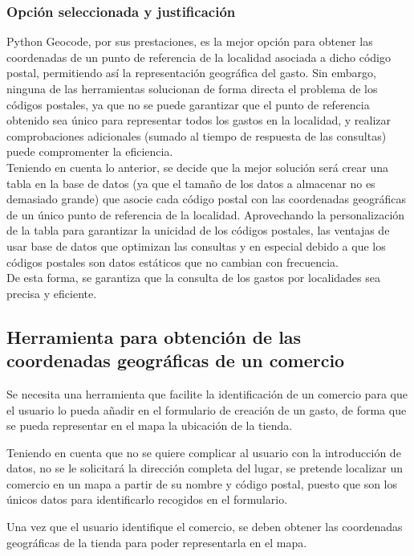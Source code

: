 \subsubsection{Opción seleccionada y justificación}\label{sec:justificacion_pgeocode}
Python Geocode, por sus prestaciones, es la mejor opción para obtener las coordenadas de un punto de referencia de la localidad asociada a dicho código postal, permitiendo así la representación geográfica del gasto. Sin embargo, ninguna de las herramientas solucionan de forma directa el problema de los códigos postales, ya que no se puede garantizar que el punto de referencia obtenido sea único para representar todos los gastos en la localidad, y realizar comprobaciones adicionales (sumado al tiempo de respuesta de las consultas) puede compromenter la eficiencia.\\
Teniendo en cuenta lo anterior, se decide que la mejor solución será crear una tabla en la base de datos (ya que el tamaño de los datos a almacenar no es demasiado grande) que asocie cada código postal con las coordenadas geográficas de un único punto de referencia de la localidad. Aprovechando la personalización de la tabla para garantizar la unicidad de los códigos postales, las ventajas de usar base de datos que optimizan las consultas y en especial debido a que los códigos postales son datos estáticos que no cambian con frecuencia.\\
De esta forma, se garantiza que la consulta de los gastos por localidades sea precisa y eficiente.


\subsection{Herramienta para obtención de las coordenadas geográficas de un comercio}
Se necesita una herramienta que facilite la identificación de un comercio para que el usuario lo pueda añadir en el formulario de creación de un gasto, de forma que se pueda representar en el mapa la ubicación de la tienda.

Teniendo en cuenta que no se quiere complicar al usuario con la introducción de datos, no se le solicitará la dirección completa del lugar, se pretende localizar un comercio en un mapa a partir de su nombre y código postal, puesto que son los únicos datos para identificarlo recogidos en el formulario.

Una vez que el usuario identifique el comercio, se deben obtener las coordenadas geográficas de la tienda para poder representarla en el mapa.\\

